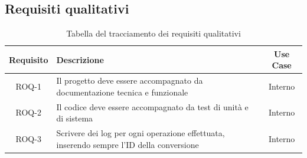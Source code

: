 \subsection{Requisiti qualitativi}
\begin{table}[H]
    \caption{Tabella del tracciamento dei requisiti qualitativi}
    \label{tab:requisiti-qualitativi}
    \begin{tabularx}{\textwidth}{|c|X|c|}
        \hline
        \textbf{Requisito}                  & \textbf{Descrizione}                    & \textbf{Use Case} \\
        \hline
        ROQ-1                               & Il progetto deve essere accompagnato da
        documentazione tecnica e funzionale & Interno                                                     \\
        \hline
        ROQ-2                               & Il codice deve essere accompagnato
        da test di unità e di sistema       & Interno
        \\
        \hline
        ROQ-3                               & Scrivere dei log per ogni
        operazione effettuata, inserendo sempre l'ID della conversione
                                            & Interno
        \\
        \hline
    \end{tabularx}
\end{table}

